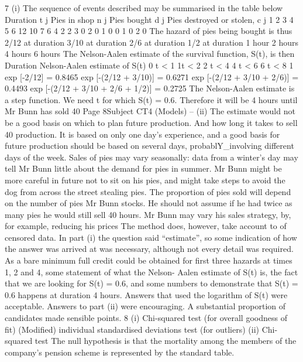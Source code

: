 7
(i)
The sequence of events described may be summarised in the table below
Duration t j Pies in shop
n j Pies bought
d j Pies destroyed or
stolen, c j
1
2
3
4
5
6 12
10
7
6
4
2 2
3
0
2
0
1 0
0
1
0
2
0
The hazard of pies being bought is thus
2/12 at duration
3/10 at duration
2/6 at duration
1/2 at duration
1 hour
2 hours
4 hours
6 hours
The Nelson-Aalen estimate of the survival function, S(t), is then
Duration Nelson-Aalen estimate of S(t)
0 \leq t < 1
1\leq t < 2
2 \leq t < 4
4 \leq t < 6
6 \leq t < 8 1
exp [-2/12] = 0.8465
exp [-(2/12 + 3/10)] = 0.6271
exp [-(2/12 + 3/10 + 2/6)] = 0.4493
exp [-(2/12 + 3/10 + 2/6 + 1/2)] = 0.2725
The Nelson-Aalen estimate is a step function.
We need t for which S(t) = 0.6.
Therefore it will be 4 hours until Mr Bunn has sold 40%
Page 8Subject CT4 (Models) – %
(ii)
The estimate would not be a good basis on which to plan future production.
And how long it takes to sell 40%
production.
It is based on only one day’s experience, and a good basis for future production
should be based on several days, probablY_involving different days of the week.
Sales of pies may vary seasonally: data from a winter’s day may tell Mr Bunn little
about the demand for pies in summer.
Mr Bunn might be more careful in future not to sit on his pies, and might take steps to
avoid the dog from across the street stealing pies.
The proportion of pies sold will depend on the number of pies Mr Bunn stocks. He
should not assume if he had twice as many pies he would still sell 40%
hours.
Mr Bunn may vary his sales strategy, by, for example, reducing his prices
The method does, however, take account to of censored data.
In part (i) the question said “estimate”, so some indication of how the answer was arrived at
was necessary, although not every detail was required. As a bare minimum full credit could
be obtained for first three hazards at times 1, 2 and 4, some statement of what the Nelson-
Aalen estimate of S(t) is, the fact that we are looking for S(t) = 0.6, and some numbers to
demonstrate that S(t) = 0.6 happens at duration 4 hours. Answers that used the logarithm of
S(t) were acceptable. Answers to part (ii) were encouraging. A substantial proportion of
candidates made sensible points.
8
(i)
Chi-squared test (for overall goodness of fit)
(Modified) individual standardised deviations test (for outliers)
(ii)
Chi-squared test
The null hypothesis is that the mortality among the members of the company’s
pension scheme is represented by the standard table.
